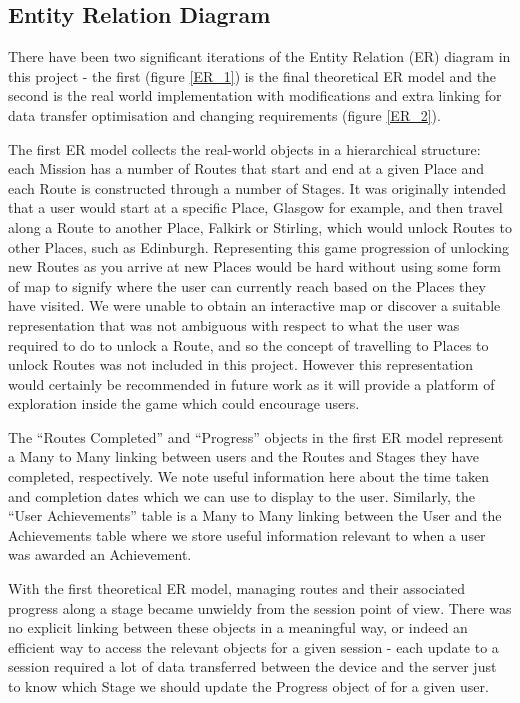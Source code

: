 \subsection{Entity Relation Diagram}
\label{sec:ER}
There have been two significant iterations of the Entity Relation (ER)
diagram in this project - the first (figure \ref{ER_1}) is the final
theoretical ER model and the second is the real world implementation
with modifications and extra linking for data transfer optimisation
and changing requirements (figure \ref{ER_2}).

The first ER model collects the real-world objects in a hierarchical
structure: each Mission has a number of Routes that start and end at a
given Place and each Route is constructed through a number of
Stages. It was originally intended that a user would start at a
specific Place, Glasgow for example, and then travel along a Route to
another Place, Falkirk or Stirling, which would unlock Routes to other
Places, such as Edinburgh. Representing this game progression of
unlocking new Routes as you arrive at new Places would be hard without
using some form of map to signify where the user can currently reach
based on the Places they have visited. We were unable to obtain an
interactive map or discover a suitable representation that was not
ambiguous with respect to what the user was required to do to unlock a
Route, and so the concept of travelling to Places to unlock Routes was
not included in this project. However this representation would
certainly be recommended in future work as it will provide a platform
of exploration inside the game which could encourage users.

The ``Routes Completed'' and ``Progress'' objects in the first ER
model represent a Many to Many linking between users and the Routes
and Stages they have completed, respectively. We note useful
information here about the time taken and completion dates which we
can use to display to the user. Similarly, the ``User Achievements''
table is a Many to Many linking between the User and the Achievements
table where we store useful information relevant to when a user was
awarded an Achievement.  

With the first theoretical ER model, managing routes and their
associated progress along a stage became unwieldy from the session
point of view. There was no explicit linking between these objects in
a meaningful way, or indeed an efficient way to access the relevant
objects for a given session - each update to a session required a lot
of data transferred between the device and the server just to know
which Stage we should update the Progress object of for a given user.

